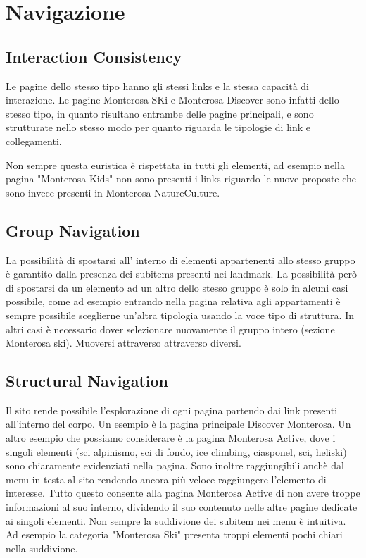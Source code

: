     \section{Navigazione}
        \subsection{Interaction Consistency}
        Le pagine dello stesso tipo hanno gli stessi links e la stessa capacità
        di interazione. Le pagine Monterosa SKi e Monterosa Discover sono
        infatti dello stesso tipo, in quanto risultano entrambe delle pagine
        principali, e sono strutturate nello stesso modo per quanto riguarda le
        tipologie di link e collegamenti.
        \begin{figure}[H]
            
        \end{figure}
        Non sempre questa euristica è rispettata in tutti gli elementi, ad
        esempio nella pagina "Monterosa Kids" non sono presenti i links riguardo
        le nuove proposte che sono invece presenti in Monterosa NatureCulture.
        \subsection{Group Navigation}
        La possibilità di spostarsi all’ interno di elementi appartenenti allo
        stesso gruppo è garantito dalla presenza dei subitems presenti nei
        landmark. La possibilità però di spostarsi da un elemento ad un altro
        dello stesso gruppo è solo in alcuni casi possibile, come ad esempio
        entrando nella pagina relativa agli appartamenti è sempre possibile
        sceglierne un'altra tipologia usando la voce tipo di struttura. In altri
        casi è necessario dover selezionare nuovamente il gruppo intero (sezione
        Monterosa ski). Muoversi attraverso attraverso diversi. 
        \subsection{Structural Navigation}
        Il sito rende possibile l'esplorazione di ogni pagina partendo dai link
        presenti all’interno del corpo. Un esempio è  la pagina principale
        Discover Monterosa.
        Un altro esempio che possiamo considerare è la pagina Monterosa Active,
        dove i singoli elementi  (sci alpinismo, sci di fondo, ice climbing,
        ciasponel, sci, heliski) sono chiaramente evidenziati nella pagina. Sono
        inoltre raggiungibili anchè dal menu in testa al sito rendendo ancora
        più veloce raggiungere l’elemento di interesse. Tutto questo consente
        alla pagina Monterosa Active di non avere troppe informazioni al suo
        interno, dividendo il suo contenuto nelle altre pagine dedicate ai
        singoli elementi.
        Non sempre la suddivione dei subitem nei menu è intuitiva. Ad esempio la
        categoria "Monterosa Ski" presenta troppi elementi pochi chiari nella
        suddivione.
